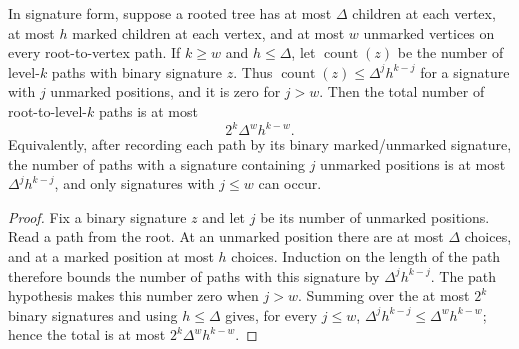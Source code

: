 \begin{lemma}
In signature form, suppose a rooted tree has at most $\Delta$ children at
each vertex, at most $h$ marked children at each vertex, and at most $w$
unmarked vertices on every root-to-vertex path.  If $k\geq w$ and
$h\leq\Delta$, let $\operatorname{count}(z)$ be the number of level-$k$
paths with binary signature $z$.  Thus
$\operatorname{count}(z)\leq\Delta^j h^{k-j}$ for a signature with $j$
unmarked positions, and it is zero for $j>w$.  Then the total number of
root-to-level-$k$ paths is at most
\[
 2^k\Delta^w h^{k-w}.
\]
Equivalently, after recording each path by its binary marked/unmarked
signature, the number of paths with a signature containing $j$ unmarked
positions is at most $\Delta^j h^{k-j}$, and only signatures with
$j\leq w$ can occur.
\end{lemma}
\begin{proof}
Fix a binary signature $z$ and let $j$ be its number of unmarked positions.
Read a path from the root.  At an unmarked position there are at most
$\Delta$ choices, and at a marked position at most $h$ choices.  Induction
on the length of the path therefore bounds the number of paths with this
signature by $\Delta^j h^{k-j}$.  The path hypothesis makes this number zero
when $j>w$.  Summing over the at most $2^k$ binary signatures and using
$h\leq\Delta$ gives, for every $j\leq w$,
$\Delta^j h^{k-j}\leq\Delta^w h^{k-w}$; hence the total is at most
$2^k\Delta^w h^{k-w}$.
\end{proof}
